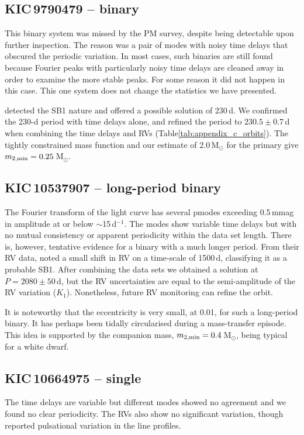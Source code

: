 \documentclass[a4paper,fleqn,usenatbib]{mnras}
\begin{document}
\subsection{KIC\,9790479 -- binary}
This binary system was missed by the PM survey, despite being detectable upon further inspection. The reason was a pair of modes with noisy time delays that obscured the periodic variation. In most cases, such binaries are still found because Fourier peaks with particularly noisy time delays are cleaned away in order to examine the more stable peaks. For some reason it did not happen in this case. This one system does not change the statistics we have presented.

\citeauthor{lampensetal2017} detected the SB1 nature and offered a possible solution of 230\,d. We confirmed the 230-d period with time delays alone, and refined the period to $230.5\pm0.7$\,d when combining the time delays and RVs (Table\:\ref{tab:appendix_c_orbits}). The tightly constrained mass function and our estimate of 2.0\,M$_{\odot}$ for the primary give $m_{\rm 2,min} = 0.25$\,M$_{\odot}$. 


\subsection{KIC\,10537907 -- long-period binary}
The Fourier transform of the light curve has several p\:modes exceeding 0.5\,mmag in amplitude at or below $\sim$15\,d$^{-1}$. The modes show variable time delays but with no mutual consistency or apparent periodicity within the data set length. There is, however, tentative evidence for a binary with a much longer period. From their RV data, \citeauthor{lampensetal2017} noted a small shift in RV on a time-scale of 1500\,d, classifying it as a probable SB1.
After combining the data sets we obtained a solution at $P=2080\pm50$\,d, but the RV uncertainties are equal to the semi-amplitude of the RV variation ($K_1$). Nonetheless, future RV monitoring can refine the orbit.

It is noteworthy that the eccentricity is very small, at 0.01, for such a long-period binary. It has perhaps been tidally circularised during a mass-transfer episode. This idea is supported by the companion mass, $m_{\rm 2,min} = 0.4$\,M$_{\odot}$, being typical for a white dwarf.


\subsection{KIC\,10664975 -- single}
The time delays are variable but different modes showed no agreement and we found no clear periodicity. The RVs also show no significant variation, though \citeauthor{lampensetal2017} reported pulsational variation in the line profiles.
\end{document}
